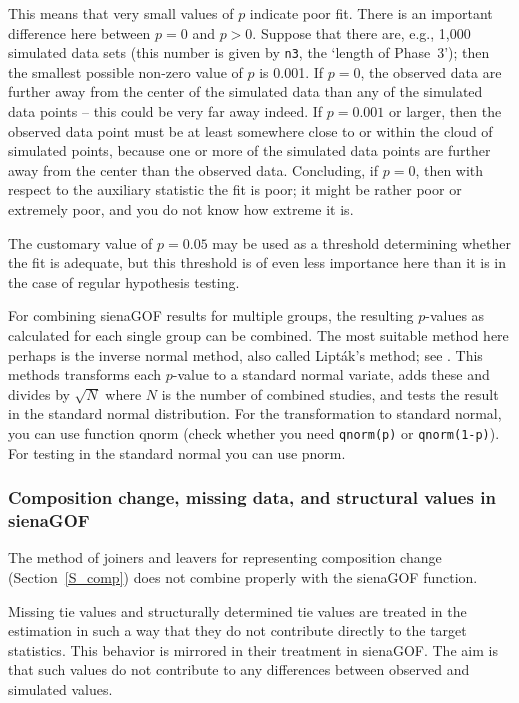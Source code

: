 \documentclass[a4paper,fleqn,11pt]{article}
\newcommand{\+}{\, + \,}
\newcommand{\sfn}[1]{\textsf{#1}}
\begin{document}
This means that very small values of $p$ indicate poor fit.
There is an important difference here between $p=0$ and $p>0$.
Suppose that there are, e.g., 1,000 simulated data sets
(this number is given by \texttt{n3}, the `length of Phase~3');
then the smallest possible non-zero value of $p$ is 0.001.
If $p=0$, the observed data are further away from the center of
the simulated data than any of the simulated data points -- this
could be very far away indeed. If $p=0.001$ or larger, then
the observed data point must be at least somewhere close to or within the
cloud of simulated points, because one or more of the simulated data
points are further away from the center than the observed data.
Concluding, if $p=0$, then with respect to the auxiliary statistic
the fit is poor; it might be rather poor or extremely poor,
and you do not know how extreme it is.

The customary value of $p=0.05$ may be used as a threshold determining
whether the fit is adequate, but this threshold is of even less
importance here than it is in the case of regular hypothesis testing.



For combining \sfn{sienaGOF} results for multiple groups, the resulting $p$-values
as calculated for each single group can be combined.
The most suitable method here perhaps is the inverse normal method,
also called Lipt\'{a}k's method; see \citet[][Section C.3]{HedgesOlkin85}.
This methods transforms each $p$-value to a standard normal variate, adds these
and divides by $\sqrt{N}$ where $N$ is the number of combined studies,
and tests the result in the standard normal distribution.
For the transformation to standard normal,
you can use function \sfn{qnorm}
(check whether you need \texttt{qnorm(p)} or \texttt{qnorm(1-p)}).
For testing in the standard normal you can use \sfn{pnorm}.


\subsubsection{Composition change, missing data, and structural values in \sfn{sienaGOF} }


The method of joiners and leavers for representing composition change
(Section~\ref{S_comp}) does not combine properly with the \sfn{sienaGOF} function.


Missing tie values and structurally determined tie values are treated
in the estimation in such a way that they do not contribute directly
to the target statistics. This behavior is mirrored in their treatment
in \sfn{sienaGOF}. The aim is that such values do not contribute
to any differences between observed and simulated values.
\end{document}
